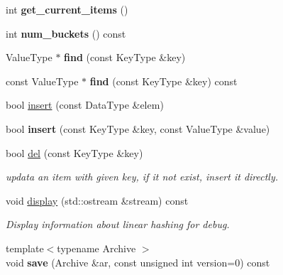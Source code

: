 \begin{CompactItemize}
\item 
\hypertarget{classLinearHashTable_9f34587eba1ac1dcbc75d91b69935a2a}{
int \textbf{get\_\-current\_\-items} ()}
\label{classLinearHashTable_9f34587eba1ac1dcbc75d91b69935a2a}

\item 
\hypertarget{classLinearHashTable_9a63048edd94def6f70b05f949067dc9}{
int \textbf{num\_\-buckets} () const }
\label{classLinearHashTable_9a63048edd94def6f70b05f949067dc9}

\item 
\hypertarget{classLinearHashTable_c045c16812af47da63e808a38f3797ef}{
ValueType $\ast$ \textbf{find} (const KeyType \&key)}
\label{classLinearHashTable_c045c16812af47da63e808a38f3797ef}

\item 
\hypertarget{classLinearHashTable_a614f36856d95f4a0b0c60114c51067f}{
const ValueType $\ast$ \textbf{find} (const KeyType \&key) const }
\label{classLinearHashTable_a614f36856d95f4a0b0c60114c51067f}

\item 
bool \hyperlink{classLinearHashTable_6cfa4db9583b1dd5615cedfb2220e7f3}{insert} (const DataType \&elem)
\item 
\hypertarget{classLinearHashTable_1a7ce5b3a45b5d15e10c39621b4dd0ff}{
bool \textbf{insert} (const KeyType \&key, const ValueType \&value)}
\label{classLinearHashTable_1a7ce5b3a45b5d15e10c39621b4dd0ff}

\item 
bool \hyperlink{classLinearHashTable_4008d6c42a099654c137d212f83176ae}{del} (const KeyType \&key)
\begin{CompactList}\small\item\em updata an item with given key, if it not exist, insert it directly. \item\end{CompactList}\item 
\hypertarget{classLinearHashTable_9c1b4c961b7b19ee6a90dcff1a542879}{
void \hyperlink{classLinearHashTable_9c1b4c961b7b19ee6a90dcff1a542879}{display} (std::ostream \&stream) const }
\label{classLinearHashTable_9c1b4c961b7b19ee6a90dcff1a542879}

\begin{CompactList}\small\item\em Display information about linear hashing for debug. \item\end{CompactList}\item 
\hypertarget{classLinearHashTable_d43140773375a24fab89a00f94718228}{
{\footnotesize template$<$typename Archive $>$ }\\void \textbf{save} (Archive \&ar, const unsigned int version=0) const }
\label{classLinearHashTable_d43140773375a24fab89a00f94718228}


\end{CompactItemize}
